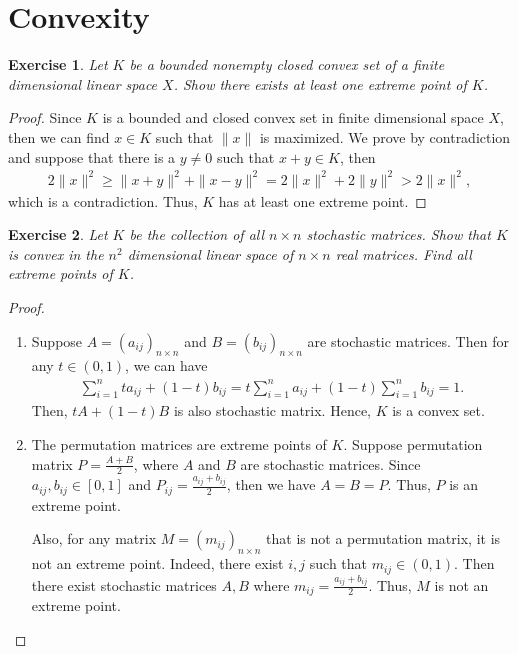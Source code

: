 \documentclass[10pt]{book}
\newtheorem{exercise}{Exercise}[section]
\theoremstyle{definition}
\numberwithin{equation}{chapter}
\begin{document}
\section{Convexity}

\begin{exercise}
Let $K$ be a bounded nonempty closed convex set of a finite dimensional linear space $X$. Show there exists at least one extreme point of $K$.
\end{exercise}
\begin{proof}
Since $K$ is a bounded and closed convex set in finite dimensional space $X$, then we can find $x\in K$ such that $\|x\|$ is maximized. We prove by contradiction and suppose that there is a $y\neq 0$ such that $x+y \in K$, then 
\begin{align*}
    2\|x\|^2 \geq \|x+y\|^2 + \|x-y\|^2 = 2\|x\|^2 + 2\|y\|^2 > 2\|x\|^2,
\end{align*}
which is a contradiction. Thus, $K$ has at least one extreme point.
\end{proof}

\medskip

\begin{exercise}
Let $K$ be the collection of all $n\times n$ stochastic matrices. Show that $K$ is convex in the $n^2$ dimensional linear space of $n\times n$ real matrices. Find all extreme points of $K$.
\end{exercise}
\begin{proof}
~\begin{enumerate}[label=(\arabic*)]
    \item Suppose $A = \left(a_{ij}\right)_{n\times n}$ and $B = \left(b_{ij}\right)_{n\times n}$ are stochastic matrices. Then for any $t\in (0,1)$, we can have 
    \begin{align*}
        \sum^n_{i=1} t a_{ij} + (1-t)b_{ij} = t \sum^n_{i=1} a_{ij} + (1-t) \sum^n_{i=1} b_{ij} = 1.
    \end{align*}
    Then, $tA + (1-t) B$ is also stochastic matrix. Hence, $K$ is a convex set.
    
    \item The permutation matrices are extreme points of $K$. Suppose permutation matrix $P = \frac{A + B}{2}$, where $A$ and $B$ are stochastic matrices. Since $a_{ij}, b_{ij} \in [0,1]$ and $P_{ij} = \frac{a_{ij} + b_{ij}}{2}$, then we have $A = B = P$. Thus, $P$ is an extreme point. 
    
    Also, for any matrix $M = \left(m_{ij}\right)_{n\times n}$ that is not a permutation matrix, it is not an extreme point. Indeed, there exist $i, j$ such that $m_{ij} \in (0,1)$. Then there exist stochastic matrices $A, B$ where $m_{ij} = \frac{a_{ij} + b_{ij}}{2}$. Thus, $M$ is not an extreme point.
\end{enumerate}
\end{proof}
\end{document}

